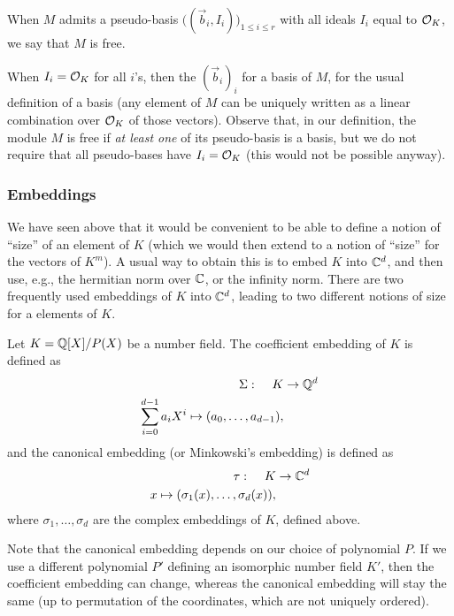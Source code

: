 \begin{definition}
When $M$ admits a pseudo-basis $\big((\vec b_i, I_i)\big)_{1 \leq i \leq r}$ with all ideals $I_i$ equal to $\mathcal{O}_K$, we say that $M$ is free.
\end{definition}
When $I_i = \mathcal{O}_K$ for all $i$'s, then the $(\vec b_i)_i$ for a basis of $M$, for the usual definition of a basis (any element of $M$ can be uniquely written as a linear combination over $\mathcal{O}_K$ of those vectors). Observe that, in our definition, the module $M$ is free if \emph{at least one} of its pseudo-basis is a basis, but we do not require that all pseudo-bases have $I_i = \mathcal{O}_K$ (this would not be possible anyway).

\subsubsection{Embeddings}
\label{sec:embeddings}
We have seen above that it would be convenient to be able to define a notion of ``size'' of an element of $K$ (which we would then extend to a notion of ``size'' for the vectors of $K^m$). A usual way to obtain this is to embed $K$ into $\mathbb{C}^d$, and then use, e.g., the hermitian norm over $\mathbb{C}$, or the infinity norm. There are two frequently used embeddings of $K$ into $\mathbb{C}^d$, leading to two different notions of size for a elements of $K$.

\begin{definition}
Let $K = \mathbb{Q}[X]/P(X)$ be a number field. The coefficient embedding of $K$ is defined as
\begin{align*}
\Sigma: \hspace{4mm} K & \rightarrow \mathbb{Q}^d \\
\sum_{i=0}^{d-1} a_i X^i \mapsto	(a_0, \dots, a_{d-1}),
\end{align*}
and the canonical embedding (or Minkowski's embedding) is defined as
\begin{align*}
\tau: \hspace{4mm} K & \rightarrow \mathbb{C}^d \\
x \mapsto	(\sigma_1(x), \dots, \sigma_d(x)),
\end{align*}
where $\sigma_1, \dots, \sigma_d$ are the complex embeddings of $K$, defined above.
\end{definition}

Note that the canonical embedding depends on our choice of polynomial $P$. If we use a different polynomial $P'$ defining an isomorphic number field $K'$, then the coefficient embedding can change, whereas the canonical embedding will stay the same (up to permutation of the coordinates, which are not uniquely ordered).

